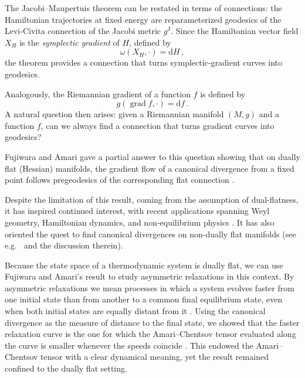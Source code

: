 \documentclass{amsart}
\theoremstyle{definition}
\begin{document}
The Jacobi–Maupertuis theorem can be restated in terms of connections: the Hamiltonian trajectories 
at fixed energy are reparameterized geodesics of the Levi‑Civita connection of the Jacobi metric $g^\text{J}$.
Since the Hamiltonian vector field $X_H$ is the \emph{symplectic gradient} of $H$, defined by $$\omega(X_H,\cdot)=\mathrm{d}H\,,$$ 
the theorem provides a  connection that turns symplectic‑gradient curves into geodesics.

Analogously, the Riemannian gradient of a function $f$ is defined by 
\begin{equation*}
g(\operatorname{grad} f,\cdot)=\mathrm{d} f\,.
\end{equation*}
A natural question then arises: given a Riemannian manifold $(M,g)$ and a function $f$, can we always find a connection that turns gradient curves into geodesics?

Fujiwara and Amari gave a partial answer to this question showing that on dually flat (Hessian) manifolds, 
the gradient flow of a canonical divergence from a fixed point follows 
pregeodesics of the corresponding flat connection \cite{fujiwara_gradient_1995}.
  
Despite the limitation of this result, coming from the assumption of dual-flatness, it has inspired continued interest, with recent applications spanning Weyl geometry, Hamiltonian dynamics, and non‑equilibrium physics \cite{wada_eikonal_2021,wada_huygens_2023,wada_weyl_2023,chanda_mechanics_2024,wada_hamiltonian_2024,wada_onsagers_2025}. It has also oriented the quest to find canonical divergences on non-dually flat manifolds (see e.g.~\cite{ay_novel_2015} and the discussion therein).

Because the state space of a thermodynamic system is dually flat, we can use Fujiwara and Amari’s result to study asymmetric relaxations in this context. By asymmetric relaxations we mean processes in which a system evolves faster from one initial state than from another to a common final equilibrium state, even when both initial states are equally distant from it \cite{lapolla_faster_2020,van2021toward,ibanez2024heating,tejero2025asymmetries,teza2026speedups}. Using the canonical divergence as the measure of distance to the final state, we showed that the faster relaxation curve is the one for which the Amari–Chentsov tensor evaluated along the curve is smaller whenever the speeds coincide \cite{bravetti_asymmetric_2025}. This endowed the Amari–Chentsov tensor with a clear dynamical meaning, yet the result remained confined to the dually flat setting.
\end{document}
